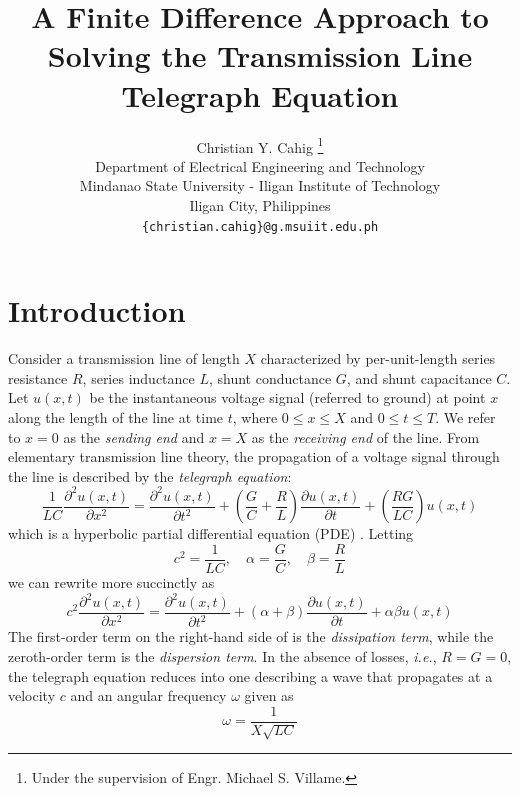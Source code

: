 \documentclass{article}
\title{A Finite Difference Approach to Solving the Transmission Line Telegraph Equation}
\author{Christian Y. Cahig
	\thanks{Under the supervision of Engr. Michael S. Villame.} \\
	Department of Electrical Engineering and Technology\\
	Mindanao State University - Iligan Institute of Technology\\
	Iligan City, Philippines \\
	\texttt{\{christian.cahig\}@g.msuiit.edu.ph} \\
}
\begin{document}
\maketitle

\begin{abstract}
\lipsum[4]
\end{abstract}

\section{Introduction}
\label{sec: Introduction}

Consider a transmission line of length $X$ characterized by per-unit-length
series resistance $R$,
series inductance $L$,
shunt conductance $G$,
and
shunt capacitance $C$.
Let $u \left(x,t\right)$ be the instantaneous voltage signal (referred to ground)
at point $x$ along the length of the line at time $t$,
where $0 \leq x \leq X$ and $0 \leq t \leq T$.
We refer to $x = 0$ as the \textit{sending end} and $x=X$ as the \textit{receiving end} of the line.
From elementary transmission line theory,
the propagation of a voltage signal through the line is described by the \textit{telegraph equation}:
\begin{equation}
   \label{eqn: Telegraph eqn full}
   \frac{1}{LC} \frac{\partial^{2} u \left(x,t\right)}{\partial x^{2}}
   =
   \frac{\partial^{2} u \left(x,t\right)}{\partial t^{2}}
   +
   \left(\frac{G}{C} + \frac{R}{L}\right) \frac{\partial u \left(x,t\right)}{\partial t}
   +
   \left(\frac{RG}{LC}\right) u \left(x,t\right)
\end{equation}
which is a hyperbolic partial differential equation (PDE) \citep{Chapra2015}.
Letting
\begin{equation*}
   c^{2} = \frac{1}{LC}, \quad \alpha = \frac{G}{C}, \quad \beta = \frac{R}{L}
\end{equation*}
we can rewrite  more succinctly as
\begin{equation}
   \label{eqn: Telegraph eqn short}
   c^{2} \frac{\partial^{2} u \left(x,t\right)}{\partial x^{2}}
   =
   \frac{\partial^{2} u \left(x,t\right)}{\partial t^{2}}
   +
   \left(\alpha + \beta\right) \frac{\partial u \left(x,t\right)}{\partial t}
   +
   \alpha \beta u \left(x,t\right)
\end{equation}
The first-order term on the right-hand side of  is the \textit{dissipation term},
while the zeroth-order term is the \textit{dispersion term}.
In the absence of losses, \textit{i.e.}, $R=G=0$, the telegraph equation reduces into one describing a wave
that propagates at a velocity $c$ and an angular frequency $\omega$ given as
\begin{equation}
   \label{eqn: Omega}
   \omega = \frac{1}{X \sqrt{LC}}
\end{equation}
\end{document}
